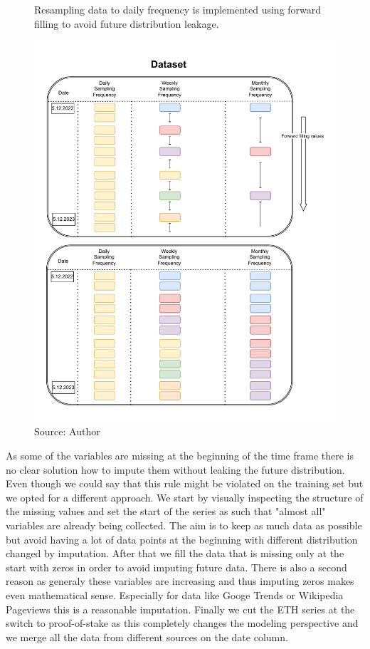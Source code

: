 \begin{figure}[!h]
    \centering
    \caption{Resampling data to daily frequency is implemented
    using forward filling to avoid future distribution leakage.}
    \includegraphics[width=1\textwidth]{Figures/data_interpolation.drawio.pdf}
    \caption*{Source: Author}    
    \label{fig:dataset_interpolation}
\end{figure}

As some of the variables are missing at the beginning of the time frame there
is no clear solution how to impute them without leaking the future distribution.
Even though we could say that this rule might be violated on the training set
but we opted for a different approach.
We start by visually inspecting the structure of the missing values and 
set the start of the series as such that "almost all" variables are already 
being collected. The aim is to keep as much data as possible but avoid
having a lot of data points at the beginning with different distribution changed 
by imputation. After that we fill the data that is missing only at the start with
zeros in order to avoid imputing future data. There is also a second reason
as generaly these variables are increasing and thus imputing zeros makes 
even mathematical sense. Especially for data like Googe Trends or Wikipedia
Pageviews this is a reasonable imputation. Finally we cut the 
\ac{ETH} series at the switch to proof-of-stake as this completely
changes the modeling perspective and we merge all the data
from different sources on the date column.


